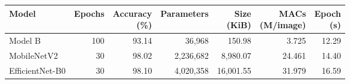 \gdef\FinalBAccuracy{93.14}%
\gdef\FinalBSize{150.98}%
\gdef\FinalBParams{36{,}968}%
\gdef\FinalBEpochs{100}%
\gdef\FinalBSelectedEpoch{100}%
\gdef\FinalMobileAccuracy{98.02}%
\gdef\FinalMobileGap{4.89}%
\gdef\FinalMobileStorageRatio{59.5}%
\gdef\FinalMobileMACRatio{6.57}%
\gdef\FinalMobileTrainingRatio{2.85}%
\gdef\FinalEfficientAccuracy{98.10}%
\gdef\FinalEfficientGap{4.96}%
\gdef\FinalEfficientStorageRatio{106.0}%
\gdef\FinalEfficientMACRatio{8.58}%
\gdef\FinalEfficientTrainingRatio{2.47}%
\gdef\FinalSOTAGap{0.07}%
\gdef\FinalSOTAExtraCorrect{3}%
\begin{tabular}{lrrrrrr}
\toprule
Model & Epochs & \shortstack[r]{Accuracy\\(\%)} & Parameters & \shortstack[r]{Size\\(KiB)} & \shortstack[r]{MACs\\(M/image)} & \shortstack[r]{Epoch\\(s)} \\
\midrule
Model B & 100 & 93.14 & 36{,}968 & 150.98 & 3.725 & 12.29 \\
MobileNetV2 & 30 & 98.02 & 2{,}236{,}682 & 8{,}980.07 & 24.461 & 14.40 \\
EfficientNet-B0 & 30 & 98.10 & 4{,}020{,}358 & 16{,}001.55 & 31.979 & 16.59 \\
\bottomrule
\end{tabular}
